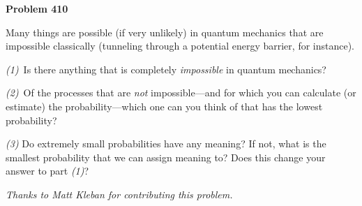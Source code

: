 \documentclass[12pt]{article}
\begin{document}
\begin{pottproblem}
\textbf{Problem 410}

Many things are possible (if very unlikely) in quantum mechanics that
are impossible classically (tunneling through a potential energy
barrier, for instance).

\textsl{(1)}~Is there anything that is completely \emph{impossible} in
quantum mechanics? 

\textsl{(2)}~Of the processes that are \emph{not} impossible---and for
which you can calculate (or estimate) the probability---which one can
you think of that has the lowest probability?

\textsl{(3)} Do extremely small probabilities have any meaning? If
not, what is the smallest probability that we can assign meaning to?
Does this change your answer to part \textsl{(1)}?

{\normalsize\emph{Thanks to Matt Kleban for contributing this problem.}}
\end{pottproblem}
\end{document}
